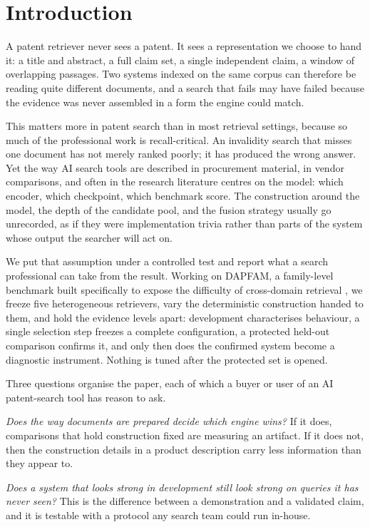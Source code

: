 \documentclass[preprint,11pt,authoryear]{elsarticle}
\begin{document}
\section{Introduction}
\label{sec:intro}

A patent retriever never sees a patent. It sees a representation we choose to hand it: a title and abstract, a full claim set, a single independent claim, a window of overlapping passages. Two systems indexed on the same corpus can therefore be reading quite different documents, and a search that fails may have failed because the evidence was never assembled in a form the engine could match.

This matters more in patent search than in most retrieval settings, because so much of the professional work is recall-critical. An invalidity search that misses one document has not merely ranked poorly; it has produced the wrong answer. Yet the way AI search tools are described in procurement material, in vendor comparisons, and often in the research literature centres on the model: which encoder, which checkpoint, which benchmark score. The construction around the model, the depth of the candidate pool, and the fusion strategy usually go unrecorded, as if they were implementation trivia rather than parts of the system whose output the searcher will act on.

We put that assumption under a controlled test and report what a search professional can take from the result. Working on DAPFAM, a family-level benchmark built specifically to expose the difficulty of cross-domain retrieval \citep{ayaou2026dapfam}, we freeze five heterogeneous retrievers, vary the deterministic construction handed to them, and hold the evidence levels apart: development characterises behaviour, a single selection step freezes a complete configuration, a protected held-out comparison confirms it, and only then does the confirmed system become a diagnostic instrument. Nothing is tuned after the protected set is opened.

Three questions organise the paper, each of which a buyer or user of an AI patent-search tool has reason to ask.

\emph{Does the way documents are prepared decide which engine wins?} If it does, comparisons that hold construction fixed are measuring an artifact. If it does not, then the construction details in a product description carry less information than they appear to.

\emph{Does a system that looks strong in development still look strong on queries it has never seen?} This is the difference between a demonstration and a validated claim, and it is testable with a protocol any search team could run in-house.
\end{document}
